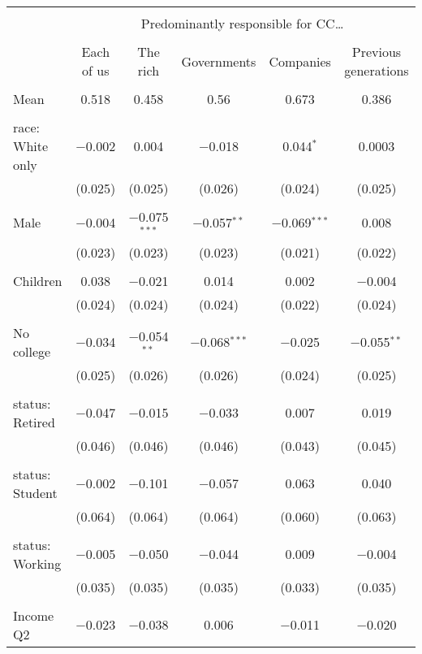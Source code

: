 
\begin{tabular}{@{\extracolsep{5pt}}lccccc} 
\\[-1.8ex]\hline 
\hline \\[-1.8ex] 
 & \multicolumn{5}{c}{Predominantly responsible for CC…} \\ 
\cline{2-6} 
\\[-1.8ex] & Each of us & The rich & Governments & Companies & Previous generations \\ 
\hline \\[-1.8ex] 
 Mean & 0.518 & 0.458 & 0.56 & 0.673 & 0.386  \\ \hline \\[-1.8ex] race: White only & $-$0.002 & 0.004 & $-$0.018 & 0.044$^{*}$ & 0.0003 \\ 
  & (0.025) & (0.025) & (0.026) & (0.024) & (0.025) \\ 
  & & & & & \\ 
 Male & $-$0.004 & $-$0.075$^{***}$ & $-$0.057$^{**}$ & $-$0.069$^{***}$ & 0.008 \\ 
  & (0.023) & (0.023) & (0.023) & (0.021) & (0.022) \\ 
  & & & & & \\ 
 Children & 0.038 & $-$0.021 & 0.014 & 0.002 & $-$0.004 \\ 
  & (0.024) & (0.024) & (0.024) & (0.022) & (0.024) \\ 
  & & & & & \\ 
 No college & $-$0.034 & $-$0.054$^{**}$ & $-$0.068$^{***}$ & $-$0.025 & $-$0.055$^{**}$ \\ 
  & (0.025) & (0.026) & (0.026) & (0.024) & (0.025) \\ 
  & & & & & \\ 
 status: Retired & $-$0.047 & $-$0.015 & $-$0.033 & 0.007 & 0.019 \\ 
  & (0.046) & (0.046) & (0.046) & (0.043) & (0.045) \\ 
  & & & & & \\ 
 status: Student & $-$0.002 & $-$0.101 & $-$0.057 & 0.063 & 0.040 \\ 
  & (0.064) & (0.064) & (0.064) & (0.060) & (0.063) \\ 
  & & & & & \\ 
 status: Working & $-$0.005 & $-$0.050 & $-$0.044 & 0.009 & $-$0.004 \\ 
  & (0.035) & (0.035) & (0.035) & (0.033) & (0.035) \\ 
  & & & & & \\ 
 Income Q2 & $-$0.023 & $-$0.038 & 0.006 & $-$0.011 & $-$0.020 \\ 

\end{tabular}
